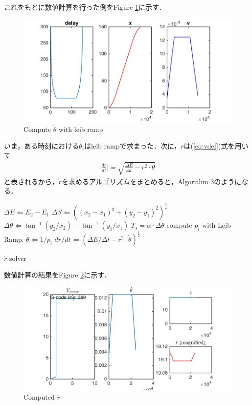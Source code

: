\documentclass[twocolumn,oneside,a4paper]{article}
\begin{document}
これをもとに数値計算を行った例をFigure \ref{fig:leib_ramp_result}に示す．

\begin{figure}[htbp]
    \includegraphics[bb=0 0 432 216,width=1\columnwidth]{leib_ramp_screenshot.png}
    \caption{Compute $\dot{\theta}$ with leib ramp}
    \label{fig:leib_ramp_result}
\end{figure}

いま，ある時刻における$\dot{\theta_i}$はleib rampで求まった．次に，$\dot r$は(\ref{eq:vdef})式を用いて
\begin{eqnarray}
     \bigg|\frac{dr}{dt}\bigg| = \sqrt{\frac{\Delta E}{\Delta t} - r^2 \cdot \dot \theta}
\end{eqnarray}
と表されるから，$\dot r$を求めるアルゴリズムをまとめると，Algorithm 3のようになる．

\begin{algorithm}[htbp]                 
\begin{algorithmic}                 
\label{alg:drdt}                         
\STATE $\Delta E \Leftarrow E_2-E_1$
\STATE $\Delta S \Leftarrow ((x_2-x_1)^2 + (y_2-y_1)^2)^{\frac{1}{2}}$
\STATE $\Delta \theta \Leftarrow \tan^{-1} (y_2/x_2) - \tan^{-1} (y_1/x_1)$
\STATE $T_s = \alpha \cdot \Delta \theta$
\STATE compute $p_i$ with Leib Ramp.
\STATE $\dot \theta \Leftarrow 1 / p_i $
\STATE $dr/dt \Leftarrow (\Delta E/\Delta t-r^2 \cdot \dot \theta)^{\frac{1}{2}}$
\end{algorithmic}
\caption{$\dot r$ solver}

\end{algorithm}

数値計算の結果をFigure \ref{eq:rdot_simulation}に示す．

\begin{figure}[htbp]
    \includegraphics[bb=0 0 432 216,width=1\columnwidth]{compute_rdot_screenshot.png}
    \caption{Computed $\dot r$}
   \label{eq:rdot_simulation}
\end{figure}
\end{document}
